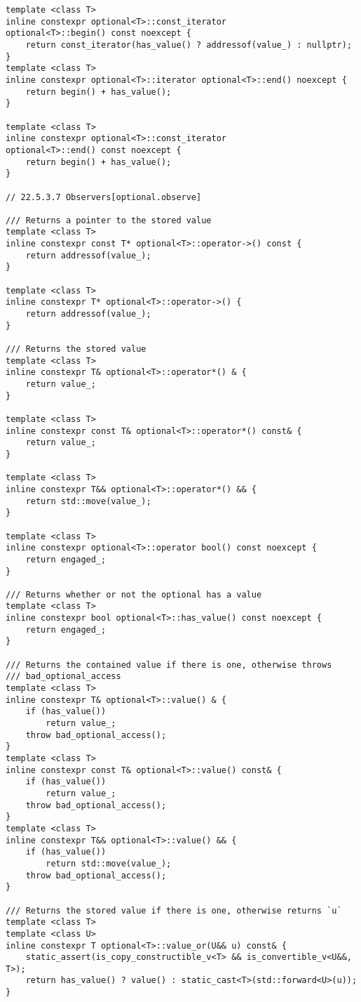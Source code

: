 \documentclass[a4paper,10pt,oneside,openany,final,article]{memoir}
\begin{document}
\begin{verbatim}
template <class T>
inline constexpr optional<T>::const_iterator
optional<T>::begin() const noexcept {
    return const_iterator(has_value() ? addressof(value_) : nullptr);
}
template <class T>
inline constexpr optional<T>::iterator optional<T>::end() noexcept {
    return begin() + has_value();
}

template <class T>
inline constexpr optional<T>::const_iterator
optional<T>::end() const noexcept {
    return begin() + has_value();
}

// 22.5.3.7 Observers[optional.observe]

/// Returns a pointer to the stored value
template <class T>
inline constexpr const T* optional<T>::operator->() const {
    return addressof(value_);
}

template <class T>
inline constexpr T* optional<T>::operator->() {
    return addressof(value_);
}

/// Returns the stored value
template <class T>
inline constexpr T& optional<T>::operator*() & {
    return value_;
}

template <class T>
inline constexpr const T& optional<T>::operator*() const& {
    return value_;
}

template <class T>
inline constexpr T&& optional<T>::operator*() && {
    return std::move(value_);
}

template <class T>
inline constexpr optional<T>::operator bool() const noexcept {
    return engaged_;
}

/// Returns whether or not the optional has a value
template <class T>
inline constexpr bool optional<T>::has_value() const noexcept {
    return engaged_;
}

/// Returns the contained value if there is one, otherwise throws
/// bad_optional_access
template <class T>
inline constexpr T& optional<T>::value() & {
    if (has_value())
        return value_;
    throw bad_optional_access();
}
template <class T>
inline constexpr const T& optional<T>::value() const& {
    if (has_value())
        return value_;
    throw bad_optional_access();
}
template <class T>
inline constexpr T&& optional<T>::value() && {
    if (has_value())
        return std::move(value_);
    throw bad_optional_access();
}

/// Returns the stored value if there is one, otherwise returns `u`
template <class T>
template <class U>
inline constexpr T optional<T>::value_or(U&& u) const& {
    static_assert(is_copy_constructible_v<T> && is_convertible_v<U&&, T>);
    return has_value() ? value() : static_cast<T>(std::forward<U>(u));
}


\end{verbatim}
\end{document}
